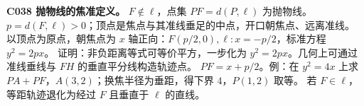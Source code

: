 \textbf{C038 抛物线的焦准定义。} $F\notin\ell$，点集 $PF=d(P,\ell)$ 为抛物线。
$p=d(F,\ell)>0$；顶点是焦点与其准线垂足的中点，开口朝焦点、远离准线。
以顶点为原点，朝焦点为 $x$ 轴正向：$F(p/2,0),\ell:x=-p/2$，标准方程 $y^2=2px$。
证明：非负距离等式可等价平方，一步化为 $y^2=2px$。几何上可通过准线垂线与 $FH$ 的垂直平分线构造轨迹点。
$PF=x+p/2$。例：在 $y^2=4x$ 上求 $PA+PF$，$A(3,2)$；换焦半径为垂距，得下界 $4$，$P(1,2)$ 取等。
若 $F\in\ell$，等距轨迹退化为经过 $F$ 且垂直于 $\ell$ 的直线。
